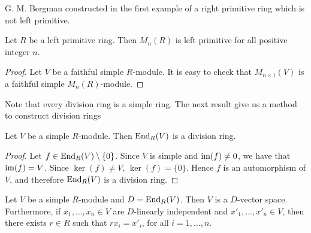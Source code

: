 G. M. Bergman constructed in \cite{Bergman} the first example of a right primitive ring which is not left primitive. 

\begin{proposition}\label{Prop1.2.3}
Let $R$ be a left primitive ring. Then $M_n(R)$ is left primitive for all positive integer $n$.
\end{proposition}

\begin{proof}
Let $V$ be a faithful simple $R$-module. It is easy to check that $M_{n\times 1}(V)$ is a faithful simple $M_n(R)$-module.
\end{proof}



Note that every division ring is a simple ring. The next result give us a method to construct division rings

\begin{proposition}
Let $V$ be a simple $R$-module. Then $\operatorname{End}_R(V)$ is a division ring.
\end{proposition}

\begin{proof}
Let $f\in \operatorname{End}_R(V)\setminus \{ 0\}$. Since $V$ is simple and $\operatorname{im}(f)\neq 0$, we have that $\operatorname{im}(f)=V$. Since
$\ker(f)\neq V$, $\ker(f)=\{0\}$. Hence $f$ is an automorphism of $V$, and therefore $\operatorname{End}_R(V)$ is a division ring.
\end{proof}

\begin{theorem}
Let $V$ be a simple $R$-module and 
$D=\operatorname{End}_R(V)$. Then $V$ is a $D$-vector space. Furthermore, if $x_1,\dots,x_n\in V$ are $D$-linearly 
independent and $x'_1,\dots,x'_n\in V$, then there exists $r\in R$ such that $rx_i=x'_i$, for all $i=1,\dots,n$.
\end{theorem}

